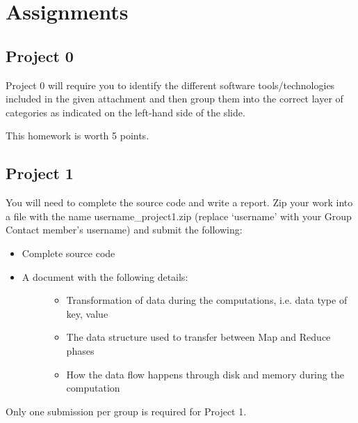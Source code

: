\part{Assignments}\label{assignments}

\chapter{Project 0}\label{assignment-0}

Project 0 will require you to identify the different software
tools/technologies included in the given attachment and then group them
into the correct layer of categories as indicated on the left-hand side
of the slide.

This homework is worth 5 points.


\chapter{Project 1}\label{project-1}

You will need to complete the source code and write a report. Zip your
work into a file with the name username\_project1.zip (replace
`username' with your Group Contact member's username) and submit the
following:

\begin{itemize}
\item
  Complete source code
\item
  \begin{description}
  \item[A document with the following details:]
  \begin{itemize}
  \tightlist
  \item
    Transformation of data during the computations, i.e. data type of
    key, value
  \item
    The data structure used to transfer between Map and Reduce phases
  \item
    How the data flow happens through disk and memory during the
    computation
  \end{itemize}
  \end{description}
\end{itemize}

Only one submission per group is required for Project 1. 
\iffalse
It is due time at 11:59 pm on Feburary 5.
\fi

%

